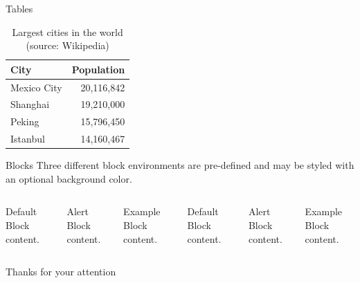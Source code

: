 \documentclass[8pt, aspectratio=169]{beamer}
\begin{document}
\begin{frame}{Tables}
  \begin{table}
    \caption{Largest cities in the world (source: Wikipedia)}
    \begin{tabular}{@{} lr @{}}
      \toprule
      City & Population\\
      \midrule
      Mexico City & 20,116,842\\
      Shanghai & 19,210,000\\
      Peking & 15,796,450\\
      Istanbul & 14,160,467\\
      \bottomrule
    \end{tabular}
  \end{table}
\end{frame}
\begin{frame}{Blocks}
  Three different block environments are pre-defined and may be styled with an
  optional background color.

  \begin{columns}[T,onlytextwidth]
      \begin{block}{Default}
        Block content.
      \end{block}

      \begin{alertblock}{Alert}
        Block content.
      \end{alertblock}

      \begin{exampleblock}{Example}
        Block content.
      \end{exampleblock}



      \begin{block}{Default}
        Block content.
      \end{block}

      \begin{alertblock}{Alert}
        Block content.
      \end{alertblock}

      \begin{exampleblock}{Example}
        Block content.
      \end{exampleblock}
  \end{columns}
\end{frame}


\begin{frame}
\huge{Thanks for your attention}
\end{frame}
\end{document}
